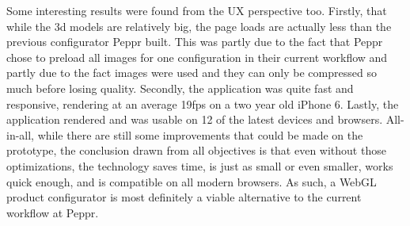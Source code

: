 Some interesting results were found from the UX perspective too. Firstly, that while the 3d models are relatively big, the page loads are actually less than the previous configurator Peppr built. This was partly due to the fact that Peppr chose to preload all images for one configuration in their current workflow and partly due to the fact images were used and they can only be compressed so much before losing quality. Secondly, the application was quite fast and responsive, rendering at an average 19fps on a two year old iPhone 6. Lastly, the application rendered and was usable on 12 of the latest devices and browsers. \newline
All-in-all, while there are still some improvements that could be made on the prototype, the conclusion drawn from all objectives is that even without those optimizations, the technology saves time, is just as small or even smaller, works quick enough, and is compatible on all modern browsers. As such, a WebGL product configurator is most definitely a viable alternative to the current workflow at Peppr.